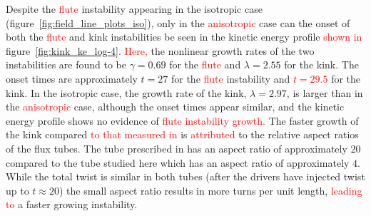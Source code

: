 \documentclass[12pt]{article}
\newcommand{\rs}[2]{\textcolor{red}{#2}}
\begin{document}
Despite the \rs{fluting}{flute} instability appearing in the isotropic
case (figure~\ref{fig:field_line_plots_iso}), only in the
\rs{switching}{anisotropic} case can the onset of both the
\rs{fluting}{flute} and kink instabilities be seen in the kinetic
energy profile \rs{}{shown in} figure~\ref{fig:kink_ke_log-4}. \rs{where}{Here,} the nonlinear
growth rates of the two instabilities are found to be $\gamma = 0.69$
for the \rs{fluting}{flute} and $\lambda = 2.55$ for the kink. The
onset times are approximately $t=27$ for the \rs{fluting}{flute}
instability and \rs{}{$t=29.5$} for
the kink. In the isotropic case, the growth rate of the kink, $\lambda
= 2.97$, is larger than in the \rs{switching}{anisotropic} case,
although the onset times appear similar, and the kinetic energy
profile shows no evidence of \rs{the growth of the \rs{fluting}{flute}
instability.}{\rs{fluting}{flute} instability growth.} 
\rs{}{}
The faster growth of the kink compared \rs{to, say, that of
  chapter~}{to that measured in}
\cite{quinnEffectAnisotropicViscosity2020} is \rs{due}{attributed} to
the relative aspect ratios of the flux tubes. The tube prescribed in
\rs{chapter~}{} \cite{quinnEffectAnisotropicViscosity2020} has an aspect
ratio of approximately $20$ compared to the tube studied here which
has an aspect ratio of approximately $4$. While the total twist is
similar in both tubes (after the drivers have injected twist up to
$t\approx20$) the small aspect ratio results in more turns per unit
length, \rs{resulting in}{leading to} a faster growing instability. 
\end{document}
